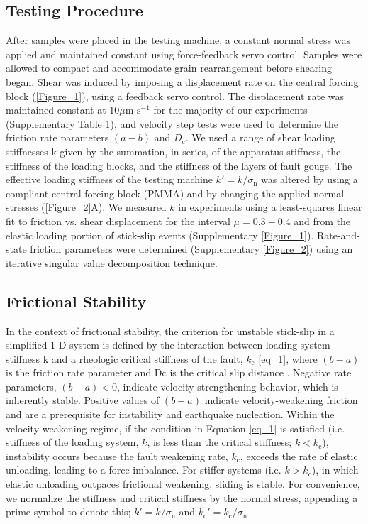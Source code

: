 \subsection{Testing Procedure}
After samples were placed in the testing machine, a constant normal stress was applied and maintained constant using force-feedback servo control. Samples were allowed to compact and accommodate grain rearrangement before shearing began. Shear was induced by imposing a displacement rate on the central forcing block (\ref{Figure_1}), using a feedback servo control. The displacement rate was maintained constant at $10 \mu\text{m s}^{-1}$ for the majority of our experiments (Supplementary Table 1), and velocity step tests were used to determine the friction rate parameters $(a-b)$ and $D_\text{c}$.
We used a range of shear loading stiffnesses k given by the summation, in series, of the apparatus stiffness, the stiffness of the loading blocks, and the stiffness of the layers of fault gouge. The effective loading stiffness of the testing machine $k'=k/\sigma_\text{n}$ was altered by using a compliant central forcing block (PMMA) and by changing the applied normal stresses (\ref{Figure_2}A).  We measured $k$ in experiments using a least-squares linear fit to friction vs. shear displacement for the interval $\mu = 0.3 - 0.4$ and from the elastic loading portion of stick-slip events (Supplementary \ref{Figure_1}). Rate-and-state friction parameters were determined (Supplementary \ref{Figure_2}) using an iterative singular value decomposition technique. 

\subsection{Frictional Stability}
In the context of frictional stability, the criterion for unstable stick-slip in a simplified 1-D system is defined by the interaction between loading system stiffness k and a rheologic critical stiffness of the fault, $k_\text{c}$ \ref{eq_1}, where $(b-a)$ is the friction rate parameter and Dc is the critical slip distance \cite{marone1998laboratory}. Negative rate parameters, $(b-a) < 0$, indicate velocity-strengthening behavior, which is inherently stable. Positive values of $(b-a)$ indicate velocity-weakening friction and are a prerequisite for instability and earthquake nucleation. Within the velocity weakening regime, if the condition in Equation \ref{eq_1} is satisfied (i.e. stiffness of the loading system, $k$, is less than the critical stiffness; $k < k_\text{c}$), instability occurs because the fault weakening rate, $k_\text{c}$, exceeds the rate of elastic unloading, leading to a force imbalance. For stiffer systems (i.e. $k > k_\text{c}$), in which elastic unloading outpaces frictional weakening, sliding is stable. For convenience, we normalize the stiffness and critical stiffness by the normal stress, appending a prime symbol to denote this; $k' = k/\sigma_\text{n}$ and $k_\text{c}' = k_\text{c}/\sigma_\text{n} $

